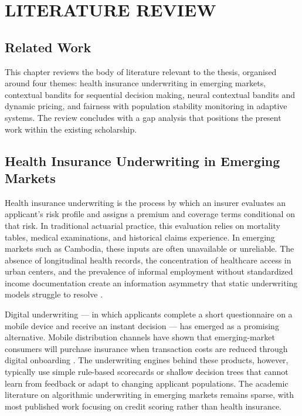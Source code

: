 \chapter{LITERATURE REVIEW}\label{chapter-iii.-literature-review}

\section{Related Work}\label{related-work}

This chapter reviews the body of literature relevant to the thesis, organised around four themes: health insurance underwriting in emerging markets, contextual bandits for sequential decision making, neural contextual bandits and dynamic pricing, and fairness with population stability monitoring in adaptive systems. The review concludes with a gap analysis that positions the present work within the existing scholarship.

\section{Health Insurance Underwriting in Emerging Markets}\label{health-insurance-underwriting-in-emerging-markets}

Health insurance underwriting is the process by which an insurer evaluates an applicant's risk profile and assigns a premium and coverage terms conditional on that risk. In traditional actuarial practice, this evaluation relies on mortality tables, medical examinations, and historical claims experience. In emerging markets such as Cambodia, these inputs are often unavailable or unreliable. The absence of longitudinal health records, the concentration of healthcare access in urban centers, and the prevalence of informal employment without standardized income documentation create an information asymmetry that static underwriting models struggle to resolve \citep{NIS2023}.

Digital underwriting --- in which applicants complete a short questionnaire on a mobile device and receive an instant decision --- has emerged as a promising alternative. Mobile distribution channels have shown that emerging-market consumers will purchase insurance when transaction costs are reduced through digital onboarding \citep{BIMA2022, ADB2023}. The underwriting engines behind these products, however, typically use simple rule-based scorecards or shallow decision trees that cannot learn from feedback or adapt to changing applicant populations. The academic literature on algorithmic underwriting in emerging markets remains sparse, with most published work focusing on credit scoring rather than health insurance.

